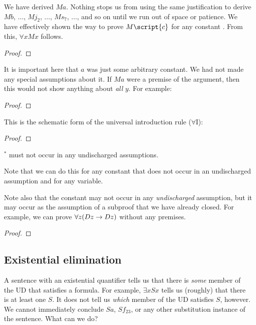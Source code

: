 We have derived $Ma$. Nothing stops us from using the same justification to derive $Mb$, $\ldots$, $Mj_2$, $\ldots$, $Ms_7$, $\ldots$, and so on until we run out of space or patience. We have effectively shown the way to prove $M\script{c}$ for any constant . From this, $\forall x Mx$ follows.

\begin{proof}
	 
	 
\end{proof}

It is important here that $a$ was just some arbitrary constant. We had not made any special assumptions about it. If $Ma$ were a premise of the argument, then this would not show anything about \emph{all} $y$. For example:

\begin{proof}
	 
	 
\end{proof}


This is the schematic form of the universal introduction rule ($\forall$I):

\begin{proof}
	 
\end{proof}
$^\ast$  must not occur in any undischarged assumptions.

Note that we can do this for any constant that does not occur in an undischarged assumption and for any variable.

Note also that the constant may not occur in any \emph{undischarged} assumption, but it may occur as the assumption of a subproof that we have already closed. For example, we can prove $\forall z(Dz \rightarrow Dz)$ without any premises.

\begin{proof}
	\open
	\close
\end{proof}


\subsection{Existential elimination}
A sentence with an existential quantifier tells us that there is \emph{some} member of the UD that satisfies a formula. For example, $\exists x Sx$ tells us (roughly) that there is at least one $S$. It does not tell us \emph{which} member of the UD satisfies $S$, however. We cannot immediately conclude $Sa$, $Sf_{23}$, or any other substitution instance of the sentence. What can we do?

